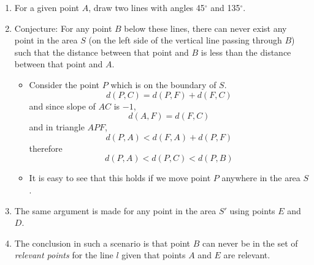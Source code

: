 \begin{enumerate}
    \item For a given point $A$, draw two lines with angles 45$^\circ$ and 135$^\circ$.
    \item Conjecture: For any point $B$ below these lines, there can never exist any point in the area $S$ (on the left side of the vertical line passing through $B$) such that the distance between that point and $B$ is less than the distance between that point and $A$.
        \begin{itemize}
            \item Consider the point $P$ which is on the boundary of $S$. \begin{equation} d(P, C) = d(P, F) + d(F, C) \end{equation} and since slope of $AC$ is $-1$, \begin{equation} d(A, F) = d(F, C) \end{equation} and in triangle $APF$, \begin{equation} d(P, A) < d(F, A) + d(P, F) \end{equation} therefore \begin{equation} d(P, A) < d(P, C) < d(P, B) \end{equation}
            \item It is easy to see that this holds if we move point $P$ anywhere in the area $S$.
        \end{itemize}
    \item The same argument is made for any point in the area $S'$ using points $E$ and $D$.
    \item The conclusion in such a scenario is that point $B$ can never be in the set of \emph{relevant points} for the line $l$ given that points $A$ and $E$ are relevant.
\end{enumerate}

